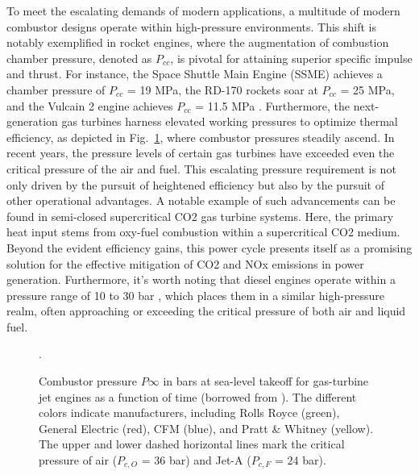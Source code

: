 To meet the escalating demands of modern applications, a multitude of modern combustor designs operate within high-pressure environments. This shift is notably exemplified in rocket engines, where the augmentation of combustion chamber pressure, denoted as $P_{cc}$, is pivotal for attaining superior specific impulse and thrust. For instance, the Space Shuttle Main Engine (SSME) achieves a chamber pressure of $P_{cc}$ = 19 MPa, the RD-170 rockets soar at $P_{cc}$ = 25 MPa, and the Vulcain 2 engine achieves $P_{cc}$ = 11.5 MPa \cite{arnold2009circumferential}. Furthermore, the next-generation gas turbines harness elevated working pressures to optimize thermal efficiency, as depicted in Fig.~\ref{Intro_gas_turbine}, where combustor pressures steadily ascend. In recent years, the pressure levels of certain gas turbines have exceeded even the critical pressure of the air and fuel. This escalating pressure requirement is not only driven by the pursuit of heightened efficiency but also by the pursuit of other operational advantages. A notable example of such advancements can be found in semi-closed supercritical CO2 gas turbine systems. Here, the primary heat input stems from oxy-fuel combustion within a supercritical CO2 medium. Beyond the evident efficiency gains, this power cycle presents itself as a promising solution for the effective mitigation of CO2 and NOx emissions in power generation. Furthermore, it's worth noting that diesel engines operate within a pressure range of 10 to 30 bar \cite{jofre2021transcritical}, which places them in a similar high-pressure realm, often approaching or exceeding the critical pressure of both air and liquid fuel.

\begin{figure}[htb]
    \centering
    \caption{Combustor pressure $P\infty$ in bars at sea-level takeoff for gas-turbine jet engines as a function of time (borrowed from \cite{jofre2021transcritical}). The different colors indicate manufacturers, including Rolls Royce (green), General Electric (red), CFM (blue), and Pratt \& Whitney (yellow). The upper and lower dashed horizontal lines mark the critical pressure of air ($P_{c,O}$ = 36 bar) and Jet-A ($P_{c,F}$ = 24 bar).} \label{Intro_gas_turbine}. 
\end{figure}


